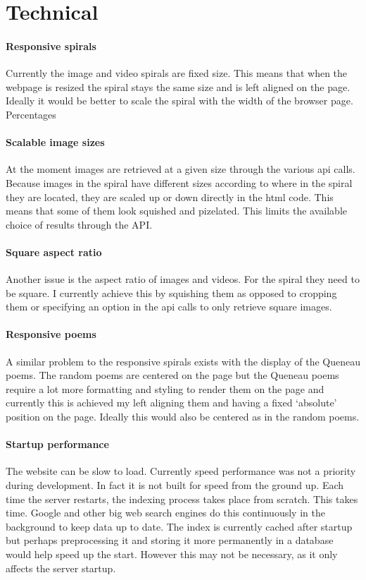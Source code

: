 \section{Technical}



\paragraph{Responsive spirals} 
Currently the image and video spirals are fixed size. This means that when the webpage is resized the spiral stays the same size and is left aligned on the page. Ideally it would be better to scale the spiral with the width of the browser page. Percentages

\paragraph{Scalable image sizes} 
At the moment images are retrieved at a given size through the various \gls{api} calls. Because images in the spiral have different sizes according to where in the spiral they are located, they are scaled up or down directly in the \gls{html} code. This means that some of them look squished and pizelated. This limits the available choice of results through the API.

\paragraph{Square aspect ratio} 
Another issue is the aspect ratio of images and videos. For the spiral they need to be square. I currently achieve this by squishing them as opposed to cropping them or specifying an option in the \gls{api} calls to only retrieve square images.

\paragraph{Responsive poems} 
A similar problem to the responsive spirals exists with the display of the Queneau poems. The random poems are centered on the page but the Queneau poems require a lot more formatting and styling to render them on the page and currently this is achieved my left aligning them and having a fixed `absolute' position on the page. Ideally this would also be centered as in the random poems. 

\paragraph{Startup performance} 
The website can be slow to load. Currently speed performance was not a priority during development. In fact it is not built for speed from the ground up. Each time the server restarts, the indexing process takes place from scratch. This takes time. Google and other big web search engines do this continuously in the background to keep data up to date. The index is currently cached after startup but perhaps preprocessing it and storing it more permanently in a database would help speed up the start. However this may not be necessary, as it only affects the server startup.

